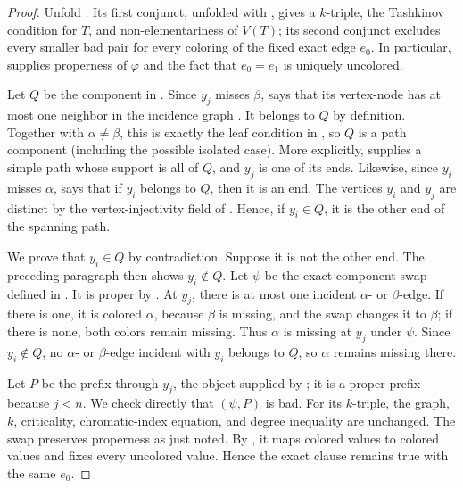 \begin{proof}
Unfold .  Its first conjunct, unfolded
with , gives a \(k\)-triple, the Tashkinov
condition for \(T\), and non-elementariness of \(V(T)\); its second
conjunct excludes every smaller bad pair for every coloring of the fixed
exact edge \(e_0\).  In particular,  supplies properness
of \(\varphi\) and the fact that \(e_0=e_1\) is uniquely uncolored.

Let \(Q\) be the component in .  Since
\(y_j\) misses \(\beta\),  says
that its vertex-node has at most one neighbor in the incidence graph
.  It belongs to \(Q\) by definition.
Together with \(\alpha\ne\beta\), this is exactly the leaf condition in
, so \(Q\) is a path component (including
the possible isolated case).  More explicitly,
 supplies a simple path whose
support is all of \(Q\), and \(y_j\) is one of its ends.  Likewise, since
\(y_i\) misses \(\alpha\),  says
that if \(y_i\) belongs to \(Q\), then it is an end.  The vertices \(y_i\)
and \(y_j\) are distinct by the vertex-injectivity field of
.  Hence, if \(y_i\in Q\), it is the other end of
the spanning path.

We prove that \(y_i\in Q\) by contradiction.  Suppose it is not the other
end.  The preceding paragraph then shows \(y_i\notin Q\).  Let
\(\psi\) be the exact component swap defined in
.  It is proper by
.  At \(y_j\), there is at most one
incident \(\alpha\)- or \(\beta\)-edge.  If there is one, it is colored
\(\alpha\), because \(\beta\) is missing, and the swap changes it to
\(\beta\); if there is none, both colors remain missing.  Thus \(\alpha\)
is missing at \(y_j\) under \(\psi\).  Since \(y_i\notin Q\), no
\(\alpha\)- or \(\beta\)-edge incident with \(y_i\) belongs to \(Q\), so
\(\alpha\) remains missing there.

Let \(P\) be the prefix through \(y_j\), the object supplied by
; it is a proper prefix because \(j<n\).
We check directly that \((\psi,P)\) is bad.  For its \(k\)-triple, the
graph, \(k\), criticality, chromatic-index equation, and degree inequality
are unchanged.  The swap preserves properness as just noted.  By
, it maps colored values to colored values
and fixes every uncolored value.  Hence the exact clause
 remains true with the same \(e_0\).


\end{proof}
